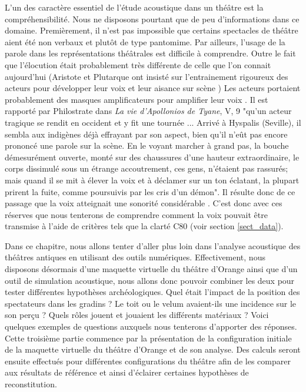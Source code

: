 L'un des caractère essentiel de l'étude acoustique dans un théâtre est la compréhensibilité. Nous ne disposons pourtant que de peu d'informations dans ce domaine. Premièrement, il n'est pas impossible que certains spectacles de théâtre aient été non verbaux et plutôt de type pantomime. Par ailleurs, l'usage de la parole dans les représentations théâtrales est difficile à comprendre. Outre le fait que l'élocution était probablement très différente de celle que l'on connait aujourd'hui (Aristote \cite[Chap IV - XIV]{aristote} et Plutarque ont insisté sur l'entrainement rigoureux des acteurs pour développer leur voix et leur aisance sur scène \cite[p.39]{canac}) Les acteurs portaient probablement des masques amplificateurs pour amplifier leur voix \cite[p.362]{arnaud}. Il est rapporté par Philostrate dans \textit{La vie d'Apollonios de Tyane}, V, 9 "qu'un acteur tragique se rendit en occident et y fit une tournée ... Arrivé à Hyspalis (Seville), il sembla aux indigènes déjà effrayant par son aspect, bien qu'il n'eût pas encore prononcé une parole sur la scène. En le voyant marcher à grand pas, la bouche démesurément ouverte, monté sur des chaussures d'une hauteur extraordinaire, le corps dissimulé sous un étrange accoutrement, ces gens, n'étaient pas rassurés; mais quand il se mit à élever la voix et à déclamer sur un ton éclatant, la plupart prirent la fuite, comme poursuivis par les cris d'un démon". Il résulte donc de ce passage que la voix atteignait une sonorité considérable \cite[p.43]{formige}. C'est donc avec ces réserves que nous tenterons de comprendre comment la voix pouvait être transmise à l'aide de critères tels que la clarté \gls{C80} (voir section \ref{sect_data}).

Dans ce chapitre, nous allons tenter d'aller plus loin dans l'analyse acoustique des théâtres antiques en utilisant des outils numériques. Effectivement, nous disposons désormais d'une maquette virtuelle du théâtre d'Orange ainsi que d'un outil de simulation acoustique, nous allons donc pouvoir combiner les deux pour tester différentes hypothèses archéologiques. Quel était l'impact de la position des spectateurs dans les gradins ? Le toit ou le \gls{velum} avaient-ils une incidence sur le son perçu ? Quels rôles jouent et jouaient les différents matériaux ? Voici quelques exemples de questions auxquels nous tenterons d'apporter des réponses. Cette troisième partie commence par la présentation de la configuration initiale de la maquette virtuelle du théâtre d'Orange et de son analyse. Des calculs seront ensuite effectués pour différentes configurations du théâtre afin de les comparer aux résultats de référence et ainsi d'éclairer certaines hypothèses de reconstitution. %
	

